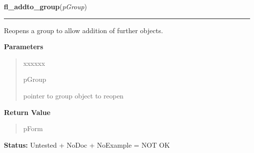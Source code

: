 \hspace{.8\funcindent}\begin{boxedminipage}{\funcwidth}

    \raggedright \textbf{fl\_addto\_group}(\textit{pGroup})

    \vspace{-1.5ex}

    \rule{\textwidth}{0.5\fboxrule}
\setlength{\parskip}{2ex}
    Reopens a group to allow addition of further objects.

\setlength{\parskip}{1ex}
      \textbf{Parameters}
      \vspace{-1ex}

      \begin{quote}
        \begin{Ventry}{xxxxxx}

          \item[pGroup]

          pointer to group object to reopen

        \end{Ventry}

      \end{quote}

      \textbf{Return Value}
    \vspace{-1ex}

      \begin{quote}
      pForm

      \end{quote}

\textbf{Status:} Untested + NoDoc + NoExample = NOT OK



    \end{boxedminipage}

    \label{xformslib:library:fl_get_object_objclass}

    \vspace{0.5ex}

